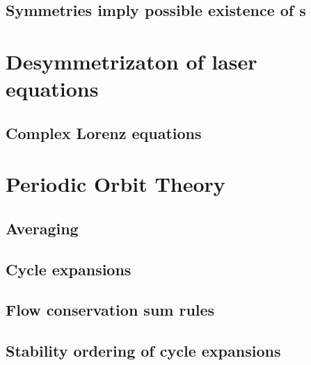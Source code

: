   \section{Symmetries imply possible existence of \rpo s}
        \label{sec:SymRPO}
        
	  
    \PublicPrivate{}{
        
                    }%

\chapter{Desymmetrizaton of laser equations}
\label{chap:lasers}

 \section{Complex Lorenz equations}
 	\label{sect:CLe}
 	


\chapter{Periodic Orbit Theory}
\label{chap:POT}
    \section{Averaging}
	

    \section{Cycle expansions}
        \label{sec:cycExp}
        

    \section{Flow conservation sum rules}
        \label{s-Cons-m-flow}
        

    \section{Stability ordering of cycle expansions}
        \label{s-StabOrd}
         



\chapter{\KSe}
\label{chap:KSe}

